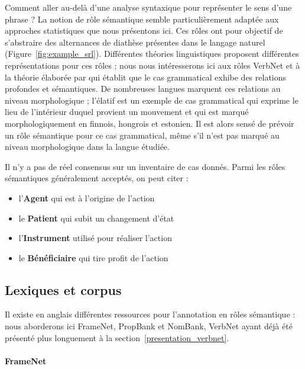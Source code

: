Comment aller au-delà d'une analyse syntaxique pour représenter le sens d'une
phrase ? La notion de rôle sémantique semble particulièrement adaptée aux
approches statistiques que nous présentons ici. Ces rôles ont pour objectif de
s'abstraire des alternances de diathèse présentes dans le langage naturel
(Figure~\ref{fig:example_srl}). Différentes théories linguistiques proposent
différentes représentations pour ces rôles ; nous nous intéresserons ici aux
rôles VerbNet et à la théorie élaborée par \cite{fillmore1968case} qui établit
que le cas grammatical exhibe des relations profondes et sémantiques. De
nombreuses langues marquent ces relations au niveau morphologique ; l'élatif
est un exemple de cas grammatical qui exprime le lieu de l'intérieur duquel
provient un mouvement et qui est marqué morphologiquement en finnois, hongrois
et estonien. Il est alors sensé de prévoir un rôle sémantique pour ce cas
grammatical, même s'il n'est pas marqué au niveau morphologique dans la langue
étudiée.

Il n'y a pas de réel consensus sur un inventaire de cas donnés. Parmi les rôles
sémantiques généralement acceptés, on peut citer :

\begin{itemize}
    \item l'\textbf{Agent} qui est à l'origine de l'action
    \item le \textbf{Patient} qui subit un changement d'état
    \item l'\textbf{Instrument} utilisé pour réaliser l'action
    \item le \textbf{Bénéficiaire} qui tire profit de l'action
\end{itemize}

\subsection{Lexiques et corpus}

Il existe en anglais différentes ressources pour l'annotation en rôles
sémantique : nous aborderons ici FrameNet, PropBank et NomBank, VerbNet ayant
déjà été présenté plus longuement à la
section~\ref{presentation_verbnet}. 

\paragraph{FrameNet}
\label{presentation_framenet}


